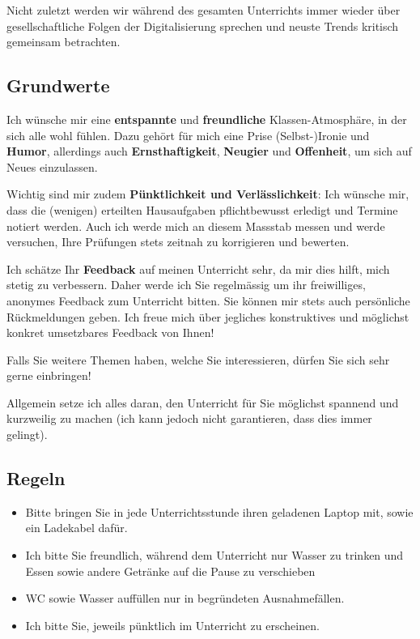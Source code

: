 Nicht zuletzt werden wir während des gesamten Unterrichts immer wieder über gesellschaftliche Folgen der Digitalisierung sprechen und neuste Trends kritisch gemeinsam betrachten.

\subsection*{Grundwerte}
Ich wünsche mir eine \textbf{entspannte} und \textbf{freundliche} Klassen-Atmosphäre, in der sich alle wohl fühlen. Dazu gehört für mich eine Prise (Selbst-)Ironie und \textbf{Humor}, allerdings auch \textbf{Ernsthaftigkeit}, \textbf{Neugier} und \textbf{Offenheit}, um sich auf Neues einzulassen. 

Wichtig sind mir zudem \textbf{Pünktlichkeit und Verlässlichkeit}: Ich wünsche mir, dass die (wenigen) erteilten Hausaufgaben pflichtbewusst erledigt und Termine notiert werden. Auch ich werde mich an diesem Massstab messen und werde versuchen, Ihre Prüfungen stets zeitnah zu korrigieren und bewerten.

Ich schätze Ihr \textbf{Feedback} auf meinen Unterricht sehr, da mir dies hilft, mich stetig zu verbessern. Daher werde ich Sie regelmässig um ihr freiwilliges, anonymes Feedback zum Unterricht bitten. Sie können mir stets auch persönliche Rückmeldungen geben. Ich freue mich über jegliches konstruktives und möglichst konkret umsetzbares Feedback von Ihnen!

Falls Sie weitere Themen haben, welche Sie interessieren, dürfen Sie sich sehr gerne einbringen!

Allgemein setze ich alles daran, den Unterricht für Sie möglichst spannend und kurzweilig zu machen (ich kann jedoch nicht garantieren, dass dies immer gelingt).

\subsection*{Regeln}

\begin{itemize}
	\item Bitte bringen Sie in jede Unterrichtsstunde ihren geladenen Laptop mit, sowie ein Ladekabel dafür. 
	\item Ich bitte Sie freundlich, während dem Unterricht nur Wasser zu trinken und Essen sowie andere Getränke auf die Pause zu verschieben
	\item WC sowie Wasser auffüllen nur in begründeten Ausnahmefällen.
	\item Ich bitte Sie, jeweils pünktlich im Unterricht zu erscheinen.
\end{itemize}